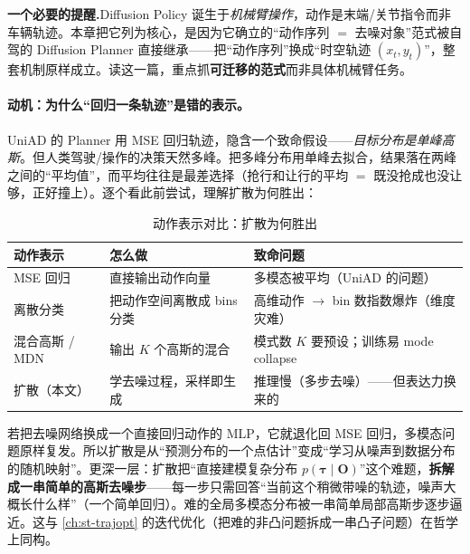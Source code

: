 \begin{note}
\textbf{一个必要的提醒.}\;Diffusion Policy 诞生于\emph{机械臂操作}，动作是末端/关节指令而非车辆轨迹。本章把它列为核心，是因为它确立的“动作序列 $=$ 去噪对象”范式被自驾的 Diffusion Planner 直接继承——把“动作序列”换成“时空轨迹 $(x_t,y_t)$”，整套机制原样成立。读这一篇，重点抓\textbf{可迁移的范式}而非具体机械臂任务。
\end{note}

\paragraph{动机：为什么“回归一条轨迹”是错的表示。}
UniAD 的 Planner 用 MSE 回归轨迹，隐含一个致命假设——\emph{目标分布是单峰高斯}。但人类驾驶/操作的决策天然多峰。把多峰分布用单峰去拟合，结果落在两峰之间的“平均值”，而平均往往是最差选择（抢行和让行的平均 $=$ 既没抢成也没让够，正好撞上）。逐个看此前尝试，理解扩散为何胜出：

\begin{table}[H]\centering\small
\caption{动作表示对比：扩散为何胜出}
\label{tab:de-action-repr}
\begin{tabular}{p{} p{} p{}}
\toprule
动作表示 & 怎么做 & 致命问题 \\
\midrule
MSE 回归 & 直接输出动作向量 & 多模态被平均（UniAD 的问题） \\
离散分类 & 把动作空间离散成 bins 分类 & 高维动作 $\to$ bin 数指数爆炸（维度灾难） \\
混合高斯 / MDN & 输出 $K$ 个高斯的混合 & 模式数 $K$ 要预设；训练易 mode collapse \\
扩散（本文） & 学去噪过程，采样即生成 & 推理慢（多步去噪）——但表达力换来的 \\
\bottomrule
\end{tabular}
\end{table}

\begin{insight}
若把去噪网络换成一个直接回归动作的 MLP，它就退化回 MSE 回归，多模态问题原样复发。所以扩散是从“预测分布的一个点估计”变成“学习从噪声到数据分布的随机映射”。更深一层：扩散把“直接建模复杂分布 $p(\boldsymbol{\tau}\mid\mathbf{O})$”这个难题，\textbf{拆解成一串简单的高斯去噪步}——每一步只需回答“当前这个稍微带噪的轨迹，噪声大概长什么样”（一个简单回归）。难的全局多模态分布被一串简单局部高斯步逐步逼近。这与 \cref{ch:st-trajopt} 的迭代优化（把难的非凸问题拆成一串凸子问题）在哲学上同构。
\end{insight}

